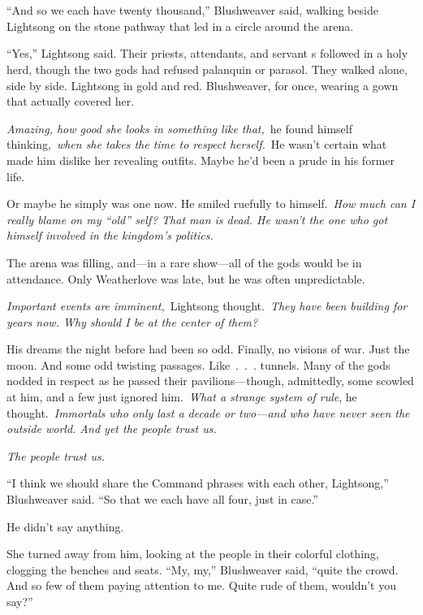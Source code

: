 \chapter{}

“And so we each have twenty thousand,” Blushweaver said, walking beside Lightsong on the stone pathway that led in a circle around the arena.

“Yes,” Lightsong said. Their priests, attendants, and servant s followed in a holy herd, though the two gods had refused palanquin or parasol. They walked alone, side by side. Lightsong in gold and red. Blushweaver, for once, wearing a gown that actually covered her.

\textit{Amazing, how good she looks in something like that,}~he found himself thinking,~\textit{when she takes the time to respect herself.}~He wasn’t certain what made him dislike her revealing outfits. Maybe he’d been a prude in his former life.

Or maybe he simply was one now. He smiled ruefully to himself.~\textit{How much can I really blame on my “old” self? That man is dead. He wasn’t the one who got himself involved in the kingdom’s politics.}

The arena was filling, and—in a rare show—all of the gods would be in attendance. Only Weatherlove was late, but he was often unpredictable.

\textit{Important events are imminent,}~Lightsong thought.~\textit{They have been building for years now. Why should I be at the center of them?}

His dreams the night before had been so odd. Finally, no visions of war. Just the moon. And some odd twisting passages. Like~.~.~. tunnels. Many of the gods nodded in respect as he passed their pavilions—though, admittedly, some scowled at him, and a few just ignored him.~\textit{What a strange system of rule}, he thought.~\textit{Immortals who only last a decade or two—and who have never seen the outside world. And yet the people trust us.}

\textit{The people trust us.}

“I think we should share the Command phrases with each other, Lightsong,” Blushweaver said. “So that we each have all four, just in case.”

He didn’t say anything.

She turned away from him, looking at the people in their colorful clothing, clogging the benches and seats. “My, my,” Blushweaver said, “quite the crowd. And so few of them paying attention to me. Quite rude of them, wouldn’t you say?”

